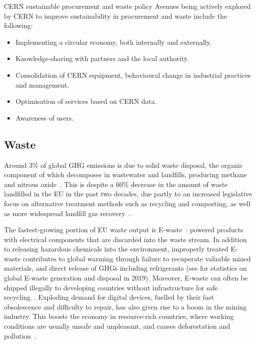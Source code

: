 \documentclass[../SustainableHEP.tex]{subfiles}
\begin{document}
\begin{bestpractice}{CERN sustainable procurement and waste policy}%
\noindent Avenues being actively explored by CERN to improve sustainability in procurement and waste include the following:
\begin{itemize}
    \item Implementing a circular economy, both internally and externally.      
\item Knowledge-sharing with partners and the local authority. 
\item Consolidation of CERN equipment, 
behavioural change in industrial practices and management. 
\item Optimisation of services based on CERN data. 
\item Awareness of users.
\end{itemize}
\end{bestpractice}

\subsection{Waste}
\label{subsec:Waste}
Around 3\% of global GHG emissions is due to solid waste disposal, the organic component of which decomposes in wastewater and landfills, producing methane and nitrous oxide~\cite{owidco2andothergreenhousegasemissions}.  This is despite a 60\% decrease in the amount of waste landfilled in the EU in the past two decades, due partly to an increased legislative focus on alternative treatment methods such as recycling and composting, as well as more widespread landfill gas recovery~\cite{Eurostat}.

The fastest-growing portion of EU waste output is E-waste~\cite{EUNews}: powered products with electrical components that are discarded into the waste stream. In addition to releasing hazardous
chemicals into the environment, improperly treated E-waste contributes to global warming through failure to recuperate valuable mined materials, and direct release of GHGs including refrigerants (see  for statistics on global E-waste generation and disposal in 2019). Moreover, E-waste can often be shipped illegally to developing countries without infrastructure for safe recycling~\cite{Forti2020, OECDLib}. Exploding demand for digital devices, fuelled by their fast obsolescence and difficulty to repair, has also given rise to a boom in the mining industry.  This boosts the economy in resource-rich countries, where working conditions are usually unsafe and unpleasant, and causes deforestation and pollution~\cite{OECDLib}.
\end{document}
